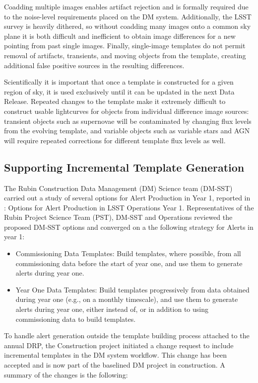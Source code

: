 Coadding multiple images enables artifact rejection   and is formally required due to the noise-level requirements placed on the DM system. 
Additionally, the LSST survey is heavily dithered, so without coadding many images onto a common sky plane it is both difficult and inefficient to obtain image differences for a new pointing from past single images.
Finally, single-image templates do not permit removal of artifacts, transients, and moving objects from the template, creating additional false positive sources in the resulting differences.

Scientifically it is important that once a template is constructed for a given region of sky, it is used exclusively until it can be updated in the next Data Release.
Repeated changes to the template make it extremely difficult to construct usable lightcurves for objects from individual difference image sources: transient objects such as supernovae will be contaminated by changing flux levels from the evolving template, and variable objects such as variable stars and AGN will require repeated corrections for different template flux levels as well.

\subsection{Supporting Incremental Template Generation}

The Rubin Construction Data Management (DM) Science team (DM-SST) carried out a study of several options for Alert Production in Year 1, reported in  : Options for Alert Production in LSST Operations Year 1.
Representatives of the Rubin Project Science Team (PST), DM-SST and Operations reviewed the proposed DM-SST options  and converged on a the following  strategy for Alerts in year 1:

\begin{itemize}
\item Commissioning Data Templates: Build templates, where possible, from all commissioning data before the start of year one, and use them to generate alerts during year one.
\item Year One Data Templates: Build templates progressively from data obtained during year one (e.g., on a monthly timescale), and use them to generate alerts during year one, either instead of, or in addition to using commissioning data to build templates.
\end{itemize}

To handle alert generation outside the template building process attached to the annual DRP, the Construction project initiated a change request to include incremental templates in the DM system workflow. This change has been accepted and is now part of the baselined DM project in construction. A summary of the changes is the following:

